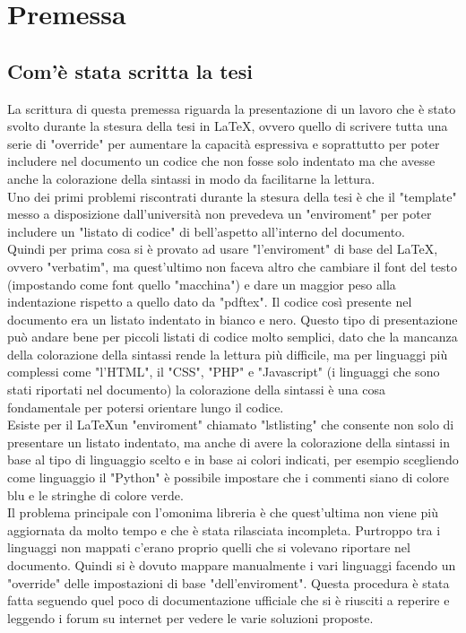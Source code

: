 \chapter{Premessa}\label{cap:premessa}

\section{Com'è stata scritta la tesi}\label{sez:Scrittura tesi}

La scrittura di questa premessa riguarda la presentazione di un lavoro che è stato svolto durante la stesura della tesi in \LaTeX, ovvero quello di scrivere tutta una serie di "override" per aumentare la capacità espressiva e soprattutto per poter includere nel documento un codice che non fosse solo indentato ma che avesse anche la colorazione della sintassi in modo da facilitarne la lettura.\\
Uno dei primi problemi riscontrati durante la stesura della tesi è che il "template" messo a disposizione dall'università non prevedeva un "enviroment" per poter includere un "listato di codice" di bell'aspetto all'interno del documento.\\
Quindi per prima cosa si è provato ad usare "l'enviroment" di base del \LaTeX, ovvero "verbatim", ma quest'ultimo non faceva altro  che cambiare il font del testo (impostando come font quello "macchina") e dare un maggior peso alla indentazione rispetto a quello dato da "pdftex". Il codice così presente nel documento era un listato indentato in bianco e nero. Questo tipo di presentazione può andare bene per piccoli listati di codice molto semplici, dato che la mancanza della colorazione della sintassi rende la lettura più difficile, ma per linguaggi più complessi come "l'HTML", il "CSS", "PHP" e "Javascript" (i linguaggi che sono stati riportati nel documento) la colorazione della sintassi è una cosa fondamentale per potersi orientare lungo il codice.\\
Esiste per il \LaTeX un "enviroment" chiamato "lstlisting" che consente non solo di presentare un listato indentato, ma anche di avere la colorazione della sintassi in base al tipo di linguaggio scelto e in base ai colori indicati, per esempio scegliendo come linguaggio il "Python" è possibile impostare che i commenti siano di colore blu e le stringhe di colore verde.\\
Il problema principale con l'omonima libreria è che quest'ultima non viene più aggiornata da molto tempo e che è stata rilasciata incompleta. Purtroppo tra i linguaggi non mappati c'erano proprio quelli che si volevano riportare nel documento. Quindi si è dovuto mappare manualmente i vari linguaggi facendo un "override" delle impostazioni di base "dell'enviroment". Questa procedura è stata fatta seguendo quel poco di documentazione ufficiale che si è riusciti a reperire e leggendo i forum su internet per vedere le varie soluzioni proposte.\\
